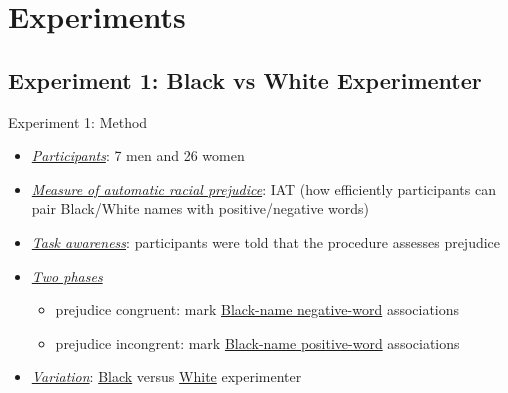 \section{Experiments}
    
    \frame{\sectionpage}

    \subsection{Experiment 1: Black vs White Experimenter}
    
    \begin{frame}{Experiment 1: Method}
        \begin{itemize}
            \item \underline{\textit{Participants}}: 7 men and 26 women
            \item \underline{\textit{Measure of automatic racial prejudice}}: IAT (how efficiently participants can pair Black/White names with positive/negative words)
            \item \underline{\textit{Task awareness}}: participants were told that the procedure assesses prejudice
            \item \underline{\textit{Two phases}}
            \begin{itemize}
                \item prejudice congruent: mark \underline{Black-name negative-word} associations %
                \item prejudice incongrent: mark \underline{Black-name positive-word} associations%
            \end{itemize}
            \item \underline{\textit{Variation}}: \underline{Black} versus \underline{White} experimenter
        \end{itemize}
    \end{frame}

